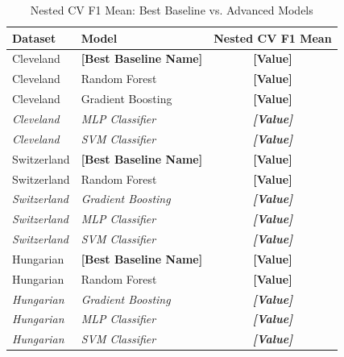 \documentclass{article}
\begin{document}
\begin{table}[htbp]
\centering
\caption{Nested CV F1 Mean: Best Baseline vs. Advanced Models}
\label{tab:advanced_comparison_nested}
\begin{tabular}{llc}
\toprule
Dataset     & Model                & Nested CV F1 Mean \\
\midrule
Cleveland   & \textbf{[Best Baseline Name]} & \textbf{[Value]}    \\
Cleveland   & Random Forest        & \textbf{[Value]}    \\
Cleveland   & Gradient Boosting    & \textbf{[Value]}    \\
\textit{Cleveland} & \textit{MLP Classifier} & \textit{\textbf{[Value]}}    \\ %
\textit{Cleveland} & \textit{SVM Classifier} & \textit{\textbf{[Value]}}    \\
\midrule
Switzerland & \textbf{[Best Baseline Name]} & \textbf{[Value]}    \\
Switzerland & Random Forest        & \textbf{[Value]}    \\
\textit{Switzerland} & \textit{Gradient Boosting} & \textit{\textbf{[Value]}}    \\
\textit{Switzerland} & \textit{MLP Classifier} & \textit{\textbf{[Value]}}    \\
\textit{Switzerland} & \textit{SVM Classifier} & \textit{\textbf{[Value]}}    \\
\midrule
Hungarian   & \textbf{[Best Baseline Name]} & \textbf{[Value]}    \\
Hungarian   & Random Forest        & \textbf{[Value]}    \\
\textit{Hungarian} & \textit{Gradient Boosting} & \textit{\textbf{[Value]}}    \\
\textit{Hungarian} & \textit{MLP Classifier} & \textit{\textbf{[Value]}}    \\
\textit{Hungarian} & \textit{SVM Classifier} & \textit{\textbf{[Value]}}    \\
\bottomrule
\end{tabular}
\end{table}
\end{document}
